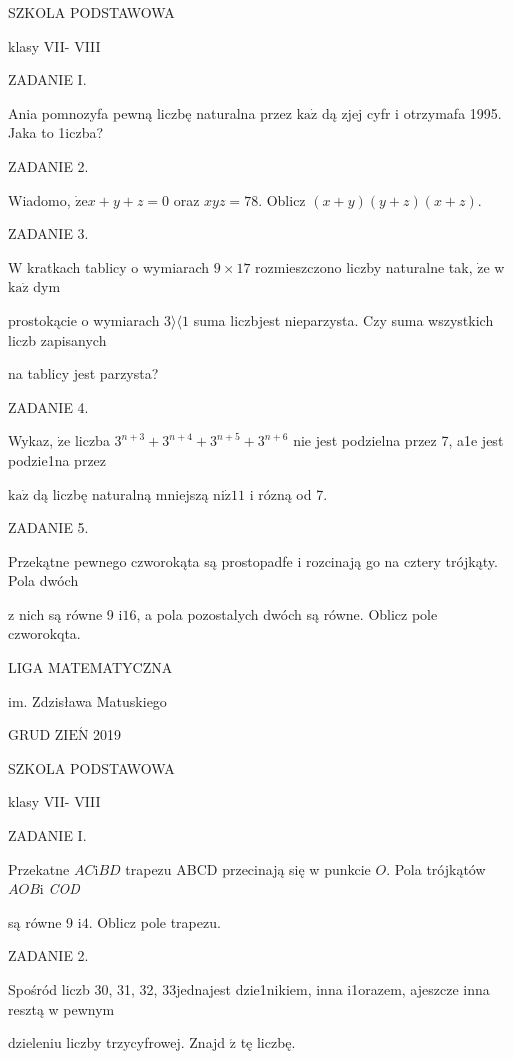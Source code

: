 \documentclass[a4paper,12pt]{article}
\begin{document}
SZKOLA PODSTAWOWA

klasy VII- VIII

ZADANIE I.

Ania pomnozyfa pewną liczbę naturalna przez $\mathrm{k}\mathrm{a}\dot{\mathrm{z}}$ dą zjej cyfr i otrzymafa 1995. Jaka to 1iczba?

ZADANIE 2.

Wiadomo, $\dot{\mathrm{z}}\mathrm{e}x+y+z=0$ oraz $xyz=78$. Oblicz $(x+y)(y+z)(x+z).$

ZADANIE 3.

$\mathrm{W}$ kratkach tablicy o wymiarach $9 \times 17$ rozmieszczono liczby naturalne tak, $\dot{\mathrm{z}}\mathrm{e}$ w $\mathrm{k}\mathrm{a}\dot{\mathrm{z}}$ dym

prostokącie o wymiarach $3\rangle\langle 1$ suma liczbjest nieparzysta. Czy suma wszystkich liczb zapisanych

na tablicy jest parzysta?

ZADANIE 4.

Wykaz, $\dot{\mathrm{z}}\mathrm{e}$ liczba $3^{n+3}+3^{n+4}+3^{n+5}+3^{n+6}$ nie jest podzielna przez 7, a1e jest podzie1na przez

$\mathrm{k}\mathrm{a}\dot{\mathrm{z}}$ dą liczbę naturalną mniejszą $\mathrm{n}\mathrm{i}\dot{\mathrm{z}}11$ i rózną od 7.

ZADANIE 5.

Przekątne pewnego czworokąta są prostopadfe i rozcinają go na cztery trójkąty. Pola dwóch

z nich są równe 9 $\mathrm{i}16$, a pola pozostalych dwóch są równe. Oblicz pole czworokqta.






LIGA MATEMATYCZNA

im. Zdzisława Matuskiego

GRUD Z$\mathrm{I}\mathrm{E}\acute{\mathrm{N}}$ 2019

SZKOLA PODSTAWOWA

klasy VII- VIII

ZADANIE I.

Przekatne $AC\mathrm{i}BD$ trapezu ABCD przecinają się w punkcie $O$. Pola trójkątów $AOB\mathrm{i}$ {\it COD}

są równe 9 $\mathrm{i}4$. Oblicz pole trapezu.

ZADANIE 2.

Spośród liczb 30, 31, 32, 33jednajest dzie1nikiem, inna i1orazem, ajeszcze inna resztą w pewnym

dzieleniu liczby trzycyfrowej. Znajd $\acute{\mathrm{z}}$ tę liczbę.
\end{document}
